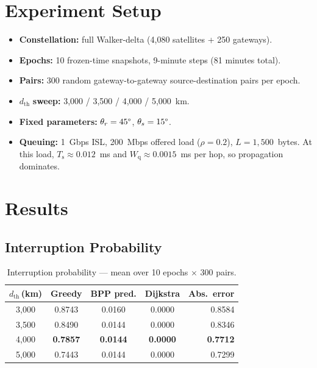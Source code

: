 \documentclass[12pt,a4paper]{report}
\newcommand{\Tser}{T_{\mathrm{s}}}
\newcommand{\Tq}{W_{\mathrm{q}}}
\newcommand{\thetar}{\theta_r}
\newcommand{\thetas}{\theta_s}
\begin{document}
\chapter{Experiment Setup}
\label{ch:expsetup}

\begin{itemize}
  \item \textbf{Constellation:} full Walker-delta (4{,}080 satellites + 250 gateways).
  \item \textbf{Epochs:} 10 frozen-time snapshots, 9-minute steps (81 minutes total).
  \item \textbf{Pairs:} 300 random gateway-to-gateway source-destination pairs per epoch.
  \item \boldmath$d_{\mathrm{th}}$\textbf{ sweep:} 3{,}000 / 3{,}500 / 4{,}000 / 5{,}000~km.
  \item \textbf{Fixed parameters:} $\thetar = 45\text{\textdegree}$, $\thetas = 15\text{\textdegree}$.
  \item \textbf{Queuing:} 1~Gbps ISL, 200~Mbps offered load ($\rho = 0.2$),
        $L = 1{,}500$~bytes. At this load, $\Tser \approx 0.012$~ms and
        $\Tq \approx 0.0015$~ms per hop, so propagation dominates.
\end{itemize}

\chapter{Results}
\label{ch:results}

\section{Interruption Probability}

\begin{table}[H]
\centering
\caption{Interruption probability — mean over 10 epochs $\times$ 300 pairs.}
\label{tab:mainresults}
\renewcommand{\arraystretch}{1.12}
\begin{tabular}{ccccr}
\toprule
\boldmath$d_\mathrm{th}$\,(km) &
\textbf{Greedy} & \textbf{BPP pred.} &
\textbf{Dijkstra} & \textbf{Abs.\ error} \\
\midrule
3{,}000 & 0.8743 & 0.0160 & 0.0000 & 0.8584 \\
3{,}500 & 0.8490 & 0.0144 & 0.0000 & 0.8346 \\
4{,}000 & \textbf{0.7857} & \textbf{0.0144} & \textbf{0.0000} & \textbf{0.7712} \\
5{,}000 & 0.7443 & 0.0144 & 0.0000 & 0.7299 \\
\bottomrule
\end{tabular}
\end{table}
\end{document}
